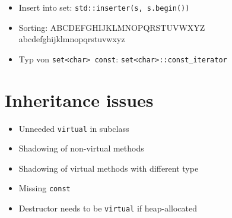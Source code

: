 \documentclass[a4paper,12pt]{article}
\begin{document}
\begin{itemize}
  \item Insert into set: \verb|std::inserter(s, s.begin())|
  \item Sorting: ABCDEFGHIJKLMNOPQRSTUVWXYZ \\ abcdefghijklmnopqrstuvwxyz
  \item Typ von \verb|set<char> const|: \verb|set<char>::const_iterator|
\end{itemize}

\section{Inheritance issues}

\begin{itemize}
\item Unneeded \verb|virtual| in subclass
\item Shadowing of non-virtual methods
\item Shadowing of virtual methods with different type
\item Missing \verb|const|
\item Destructor needs to be \verb|virtual| if heap-allocated
\end{itemize}
\end{document}
